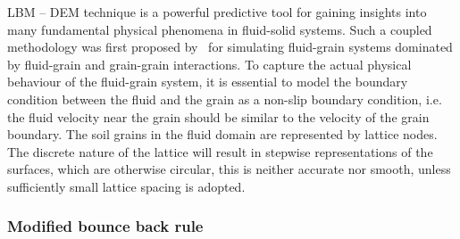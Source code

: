 LBM -- DEM technique is a powerful predictive tool for gaining insights into 
many fundamental physical phenomena in fluid-solid systems. 
Such a coupled methodology was first proposed by~\citep{Cook2004} for 
simulating fluid-grain systems dominated by fluid-grain and grain-grain 
interactions. To capture the actual physical behaviour of the fluid-grain 
system, it is essential to model the boundary condition between the fluid and 
the grain as a non-slip boundary condition, i.e. the fluid velocity near the 
grain should be similar to the velocity of the grain boundary. The soil grains 
in the fluid domain are represented by lattice nodes. The discrete nature of 
the lattice will result in stepwise representations of the surfaces, which are 
otherwise circular, this is  neither accurate nor smooth, unless sufficiently 
small lattice spacing is adopted. 


\subsubsection*{Modified bounce back rule}

